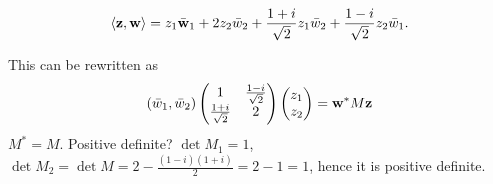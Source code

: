 \documentclass[10pt, a4paper]{article}
\begin{document}
\begin{problem}[$32$]
    \[
    \langle\mathbf{z}, \mathbf{w}\rangle = z_1\bar{\mathbf{w}}_1 + 2z_2\bar{w}_2 + \frac{1 + i}{\sqrt{2}}z_1\bar{w}_2 + \frac{1 - i}{\sqrt{2}}z_2\bar{w}_1.
    \]

    \begin{solution}
        This can be rewritten as
        \[
        (\bar{w}_1, \bar{w}_2)\begin{pmatrix}
            1 & \frac{1 - i}{\sqrt{2}} \\
            \frac{1 + i}{\sqrt{2}} & 2
        \end{pmatrix}\begin{pmatrix}
            z_1 \\ z_2
        \end{pmatrix} = \mathbf{w} ^ {*}M\mathbf{z}
        \]
        $M ^ {*} = M$.
        Positive definite?
        $\det{M_1} = 1$,
        $\det{M_2} = \det{M} = 2 - \frac{(1 - i)(1 + i)}{2} = 2 - 1 = 1$,
        hence it is positive definite.
    \end{solution}
\end{problem}
\end{document}
